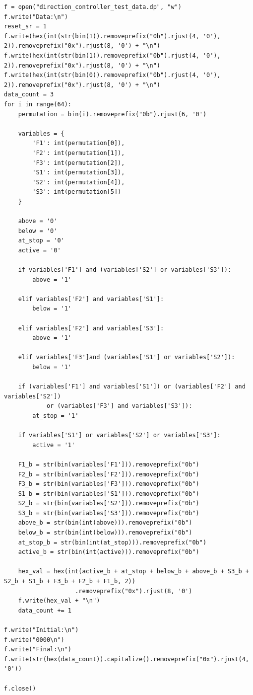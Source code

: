 \documentclass[a4paper]{article}
\begin{document}
\begin{verbatim}
f = open("direction_controller_test_data.dp", "w")
f.write("Data:\n")
reset_sr = 1
f.write(hex(int(str(bin(1)).removeprefix("0b").rjust(4, '0'), 2)).removeprefix("0x").rjust(8, '0') + "\n")
f.write(hex(int(str(bin(1)).removeprefix("0b").rjust(4, '0'), 2)).removeprefix("0x").rjust(8, '0') + "\n")
f.write(hex(int(str(bin(0)).removeprefix("0b").rjust(4, '0'), 2)).removeprefix("0x").rjust(8, '0') + "\n")
data_count = 3
for i in range(64):
    permutation = bin(i).removeprefix("0b").rjust(6, '0')
    
    variables = {
        'F1': int(permutation[0]),
        'F2': int(permutation[1]),
        'F3': int(permutation[2]),
        'S1': int(permutation[3]),
        'S2': int(permutation[4]),
        'S3': int(permutation[5])
    }

    above = '0'
    below = '0'
    at_stop = '0'
    active = '0'

    if variables['F1'] and (variables['S2'] or variables['S3']):
        above = '1'
    
    elif variables['F2'] and variables['S1']:
        below = '1'

    elif variables['F2'] and variables['S3']:
        above = '1'
    
    elif variables['F3']and (variables['S1'] or variables['S2']):
        below = '1'

    if (variables['F1'] and variables['S1']) or (variables['F2'] and variables['S2']) 
            or (variables['F3'] and variables['S3']):
        at_stop = '1'

    if variables['S1'] or variables['S2'] or variables['S3']:
        active = '1'

    F1_b = str(bin(variables['F1'])).removeprefix("0b")
    F2_b = str(bin(variables['F2'])).removeprefix("0b")
    F3_b = str(bin(variables['F3'])).removeprefix("0b")
    S1_b = str(bin(variables['S1'])).removeprefix("0b")
    S2_b = str(bin(variables['S2'])).removeprefix("0b")
    S3_b = str(bin(variables['S3'])).removeprefix("0b")
    above_b = str(bin(int(above))).removeprefix("0b")
    below_b = str(bin(int(below))).removeprefix("0b")
    at_stop_b = str(bin(int(at_stop))).removeprefix("0b")
    active_b = str(bin(int(active))).removeprefix("0b")

    hex_val = hex(int(active_b + at_stop + below_b + above_b + S3_b + S2_b + S1_b + F3_b + F2_b + F1_b, 2))
                    .removeprefix("0x").rjust(8, '0')
    f.write(hex_val + "\n")
    data_count += 1

f.write("Initial:\n")
f.write("0000\n")
f.write("Final:\n")
f.write(str(hex(data_count)).capitalize().removeprefix("0x").rjust(4, '0'))

f.close()
\end{verbatim}
\end{document}
